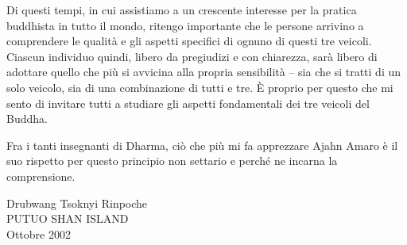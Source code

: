 Di questi tempi, in cui assistiamo a un crescente interesse per la pratica buddhista in tutto il mondo, ritengo importante che le persone arrivino a comprendere le qualità e gli aspetti specifici di ognuno di questi tre veicoli. Ciascun individuo quindi, libero da pregiudizi e con chiarezza, sarà libero di adottare quello che più si avvicina alla propria sensibilità -- sia che si tratti di un solo veicolo, sia di una combinazione di tutti e tre. È proprio per questo che mi sento di invitare tutti a studiare gli aspetti fondamentali dei tre veicoli del Buddha.

Fra i tanti insegnanti di Dharma, ciò che più mi fa apprezzare Ajahn Amaro è il suo rispetto per questo principio non settario e perché ne incarna la comprensione.

\bigskip

{\raggedleft\par Drubwang Tsoknyi Rinpoche \\
PUTUO SHAN ISLAND \\
Ottobre 2002 \par}